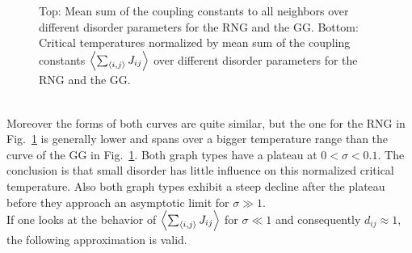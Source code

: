         \begin{figure}[hbt]
            \centering


            \caption[Critical Temperature Normalized by Mean Sum of the Coupling Constants]
            {
                Top: Mean sum of the coupling constants to all
                neighbors over different disorder parameters for
                 the RNG and
                 the GG.
                Bottom: Critical temperatures normalized by mean sum of the
                coupling constants \(\left< \sum_{\left< i,j \right>} J_{ij} \right>\) over different
                disorder parameters for
                 the RNG and
                 the GG.
            }
            \label{fig:TcJ}
        \end{figure}\\
        Moreover the forms of both curves are quite similar, but the
        one for the RNG in Fig.\ \ref{fig:TcJ}
        is generally lower and spans over a bigger temperature range than
        the curve of the GG in Fig.\ \ref{fig:TcJ}.
        Both graph types have a plateau at \(0 < \sigma < 0.1\). The conclusion
        is that small disorder has little influence on this normalized critical
        temperature.
        Also both graph types exhibit a steep decline after the plateau before
        they approach an asymptotic limit for \(\sigma \gg 1\).\\
        If one looks at the behavior of \(\left< \sum_{\left< i,j \right>} J_{ij} \right>\)
        for \(\sigma \ll 1\) and consequently \(d_{ij} \approx 1\), the
        following approximation is valid.
